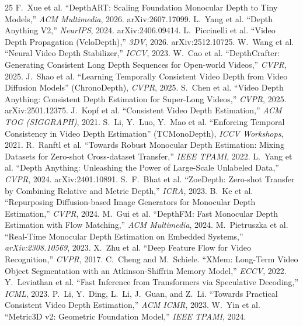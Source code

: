 \documentclass[10pt,twocolumn]{article}
\begin{document}
\begin{thebibliography}{25}\small
{} F.~Xue et al. ``DepthART: Scaling Foundation Monocular Depth to Tiny Models,'' \emph{ACM Multimedia}, 2026. arXiv:2607.17099.
 L.~Yang et al. ``Depth Anything V2,'' \emph{NeurIPS}, 2024. arXiv:2406.09414.
 L.~Piccinelli et al. ``Video Depth Propagation (VeloDepth),'' \emph{3DV}, 2026. arXiv:2512.10725.
 W.~Wang et al. ``Neural Video Depth Stabilizer,'' \emph{ICCV}, 2023.
 W.~Cao et al. ``DepthCrafter: Generating Consistent Long Depth Sequences for Open-world Videos,'' \emph{CVPR}, 2025.
 J.~Shao et al. ``Learning Temporally Consistent Video Depth from Video Diffusion Models'' (ChronoDepth), \emph{CVPR}, 2025.
 S.~Chen et al. ``Video Depth Anything: Consistent Depth Estimation for Super-Long Videos,'' \emph{CVPR}, 2025. arXiv:2501.12375.
 J.~Kopf et al. ``Consistent Video Depth Estimation,'' \emph{ACM TOG (SIGGRAPH)}, 2021.
 S.~Li, Y.~Luo, Y.~Mao et al. ``Enforcing Temporal Consistency in Video Depth Estimation'' (TCMonoDepth), \emph{ICCV Workshops}, 2021.
 R.~Ranftl et al. ``Towards Robust Monocular Depth Estimation: Mixing Datasets for Zero-shot Cross-dataset Transfer,'' \emph{IEEE TPAMI}, 2022.
 L.~Yang et al. ``Depth Anything: Unleashing the Power of Large-Scale Unlabeled Data,'' \emph{CVPR}, 2024. arXiv:2401.10891.
 S.~F.~Bhat et al. ``ZoeDepth: Zero-shot Transfer by Combining Relative and Metric Depth,'' \emph{ICRA}, 2023.
 B.~Ke et al. ``Repurposing Diffusion-based Image Generators for Monocular Depth Estimation,'' \emph{CVPR}, 2024.
 M.~Gui et al. ``DepthFM: Fast Monocular Depth Estimation with Flow Matching,'' \emph{ACM Multimedia}, 2024.
 M.~Pietruszka et al. ``Real-Time Monocular Depth Estimation on Embedded Systems,'' \emph{arXiv:2308.10569}, 2023.
 X.~Zhu et al. ``Deep Feature Flow for Video Recognition,'' \emph{CVPR}, 2017.
 C.~Cheng and M.~Schiele. ``XMem: Long-Term Video Object Segmentation with an Atkinson-Shiffrin Memory Model,'' \emph{ECCV}, 2022.
 Y.~Leviathan et al. ``Fast Inference from Transformers via Speculative Decoding,'' \emph{ICML}, 2023.
 P.~Li, Y.~Ding, L.~Li, J.~Guan, and Z.~Li. ``Towards Practical Consistent Video Depth Estimation,'' \emph{ACM ICMR}, 2023.
 W.~Yin et al. ``Metric3D v2: Geometric Foundation Model,'' \emph{IEEE TPAMI}, 2024.

\end{thebibliography}
\end{document}
